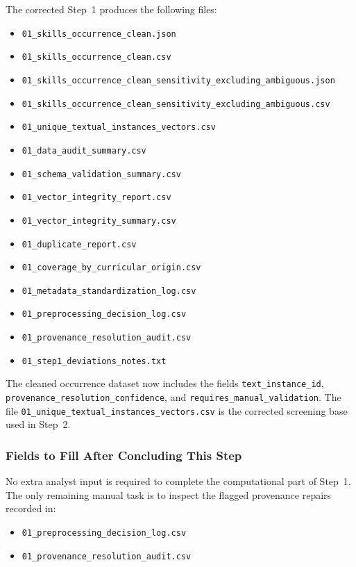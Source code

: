 The corrected Step~1 produces the following files:
\begin{itemize}
    \item \texttt{01\_skills\_occurrence\_clean.json}
    \item \texttt{01\_skills\_occurrence\_clean.csv}
    \item \texttt{01\_skills\_occurrence\_clean\_sensitivity\_excluding\_ambiguous.json}
    \item \texttt{01\_skills\_occurrence\_clean\_sensitivity\_excluding\_ambiguous.csv}
    \item \texttt{01\_unique\_textual\_instances\_vectors.csv}
    \item \texttt{01\_data\_audit\_summary.csv}
    \item \texttt{01\_schema\_validation\_summary.csv}
    \item \texttt{01\_vector\_integrity\_report.csv}
    \item \texttt{01\_vector\_integrity\_summary.csv}
    \item \texttt{01\_duplicate\_report.csv}
    \item \texttt{01\_coverage\_by\_curricular\_origin.csv}
    \item \texttt{01\_metadata\_standardization\_log.csv}
    \item \texttt{01\_preprocessing\_decision\_log.csv}
    \item \texttt{01\_provenance\_resolution\_audit.csv}
    \item \texttt{01\_step1\_deviations\_notes.txt}
\end{itemize}

The cleaned occurrence dataset now includes the fields \texttt{text\_instance\_id}, \texttt{provenance\_resolution\_confidence}, and \texttt{requires\_manual\_validation}. The file \texttt{01\_unique\_textual\_instances\_vectors.csv} is the corrected screening base used in Step~2.

\subsubsection{Fields to Fill After Concluding This Step}
\label{sec:step1_fields_to_fill}

No extra analyst input is required to complete the computational part of Step~1. The only remaining manual task is to inspect the flagged provenance repairs recorded in:
\begin{itemize}
    \item \texttt{01\_preprocessing\_decision\_log.csv}
    \item \texttt{01\_provenance\_resolution\_audit.csv}
\end{itemize}

